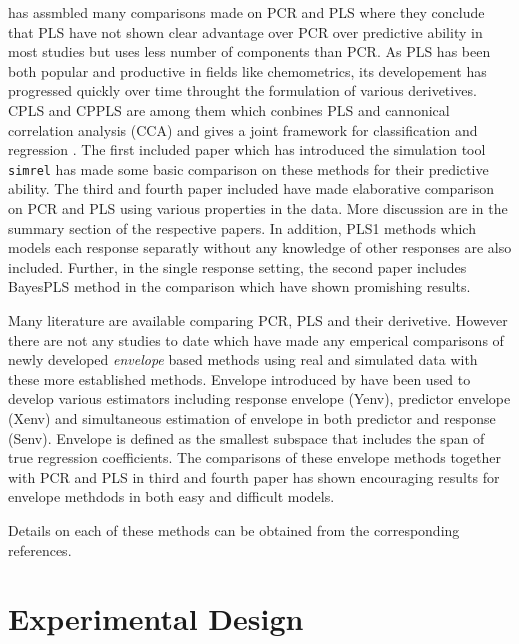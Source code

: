 \documentclass[11pt,twoside,openright,titlepage,
  headinclude,footinclude,BCOR=5mm,
  numbers=noenddot,cleardoublepage=empty,
  tablecaptionabove, dottedtoc,
  bibliography=totoc]{scrreprt}
\begin{document}
\citet{WENTZELL2003257} has assmbled many comparisons made on PCR and PLS where they conclude that PLS have not shown clear advantage over PCR over predictive ability in most studies but uses less number of components than PCR. As PLS has been both popular and productive in fields like chemometrics, its developement has progressed quickly over time throught the formulation of various derivetives. CPLS and CPPLS are among them which conbines PLS and cannonical correlation analysis (CCA) and gives a joint framework for classification and regression \citep{indahl2009canonical}. The first included paper which has introduced the simulation tool \texttt{simrel} has made some basic comparison on these methods for their predictive ability. The third and fourth paper included have made elaborative comparison on PCR and PLS using various properties in the data. More discussion are in the summary section of the respective papers. In addition, PLS1 methods which models each response separatly without any knowledge of other responses are also included. Further, in the single response setting, the second paper includes BayesPLS \citep{helland2012near} method in the comparison which have shown promishing results.

Many literature are available comparing PCR, PLS and their derivetive. However there are not any studies to date which have made any emperical comparisons of newly developed \emph{envelope} based methods using real and simulated data with these more established methods. Envelope introduced by \citet{Cook2007a} have been used to develop various estimators including response envelope (Yenv), predictor envelope (Xenv) and simultaneous estimation of envelope in both predictor and response (Senv). Envelope is defined as the smallest subspace that includes the span of true regression coefficients. The comparisons of these envelope methods together with PCR and PLS in third and fourth paper has shown encouraging results for envelope methdods in both easy and difficult models.

Details on each of these methods can be obtained from the corresponding references.

\hypertarget{experimental-design}{%
\section{Experimental Design}\label{experimental-design}}
\end{document}
